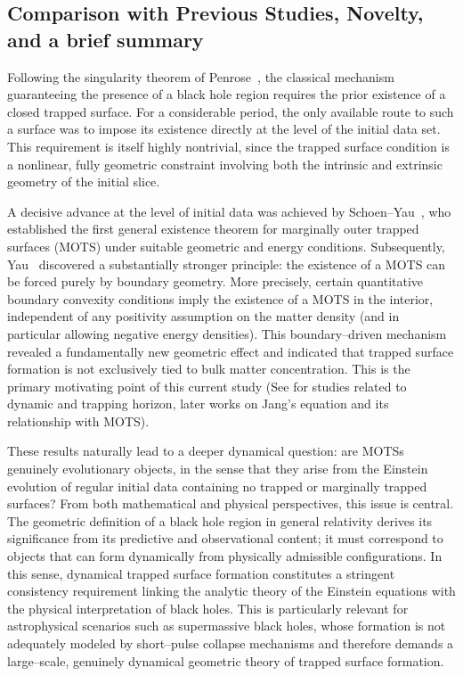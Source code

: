 \documentclass{amsart}
\begin{document}
\subsection{Comparison with Previous Studies, Novelty, and a brief summary}
\par\noindent Following the singularity theorem of Penrose~\cite{P73}, the classical mechanism guaranteeing the presence of a black hole region requires the prior existence of a closed trapped surface. For a considerable period, the only available route to such a surface was to impose its existence directly at the level of the initial data set. This requirement is itself highly nontrivial, since the trapped surface condition is a nonlinear, fully geometric constraint involving both the intrinsic and extrinsic geometry of the initial slice.

\noindent A decisive advance at the level of initial data was achieved by Schoen--Yau~\cite{SY83}, who established the first general existence theorem for marginally outer trapped surfaces (MOTS) under suitable geometric and energy conditions. Subsequently, Yau~\cite{yau} discovered a substantially stronger principle: the existence of a MOTS can be forced purely by boundary geometry. More precisely, certain quantitative boundary convexity conditions imply the existence of a MOTS in the interior, independent of any positivity assumption on the matter density (and in particular allowing negative energy densities). This boundary–driven mechanism revealed a fundamentally new geometric effect and indicated that trapped surface formation is not exclusively tied to bulk matter concentration. This is the primary motivating point of this current study (See \cite{lars1,lars2} for studies related to dynamic and trapping horizon, later works on Jang's equation and its relationship with MOTS). 

\noindent These results naturally lead to a deeper dynamical question: are MOTSs genuinely evolutionary objects, in the sense that they arise from the Einstein evolution of regular initial data containing no trapped or marginally trapped surfaces? From both mathematical and physical perspectives, this issue is central. The geometric definition of a black hole region in general relativity derives its significance from its predictive and observational content; it must correspond to objects that can form dynamically from physically admissible configurations. In this sense, dynamical trapped surface formation constitutes a stringent consistency requirement linking the analytic theory of the Einstein equations with the physical interpretation of black holes. This is particularly relevant for astrophysical scenarios such as supermassive black holes, whose formation is not adequately modeled by short–pulse collapse mechanisms and therefore demands a large–scale, genuinely dynamical geometric theory of trapped surface formation.
\end{document}
